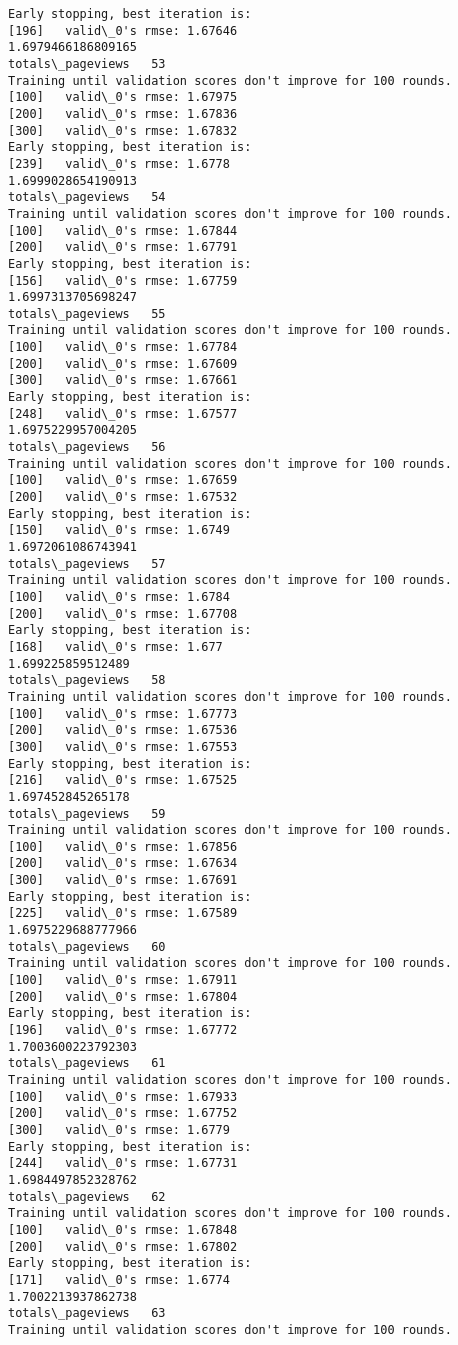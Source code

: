 \documentclass[11pt]{article}
\begin{document}
\begin{Verbatim}[commandchars=\\\{\}]
Early stopping, best iteration is:
[196]	valid\_0's rmse: 1.67646
1.6979466186809165
totals\_pageviews   53
Training until validation scores don't improve for 100 rounds.
[100]	valid\_0's rmse: 1.67975
[200]	valid\_0's rmse: 1.67836
[300]	valid\_0's rmse: 1.67832
Early stopping, best iteration is:
[239]	valid\_0's rmse: 1.6778
1.6999028654190913
totals\_pageviews   54
Training until validation scores don't improve for 100 rounds.
[100]	valid\_0's rmse: 1.67844
[200]	valid\_0's rmse: 1.67791
Early stopping, best iteration is:
[156]	valid\_0's rmse: 1.67759
1.6997313705698247
totals\_pageviews   55
Training until validation scores don't improve for 100 rounds.
[100]	valid\_0's rmse: 1.67784
[200]	valid\_0's rmse: 1.67609
[300]	valid\_0's rmse: 1.67661
Early stopping, best iteration is:
[248]	valid\_0's rmse: 1.67577
1.6975229957004205
totals\_pageviews   56
Training until validation scores don't improve for 100 rounds.
[100]	valid\_0's rmse: 1.67659
[200]	valid\_0's rmse: 1.67532
Early stopping, best iteration is:
[150]	valid\_0's rmse: 1.6749
1.6972061086743941
totals\_pageviews   57
Training until validation scores don't improve for 100 rounds.
[100]	valid\_0's rmse: 1.6784
[200]	valid\_0's rmse: 1.67708
Early stopping, best iteration is:
[168]	valid\_0's rmse: 1.677
1.699225859512489
totals\_pageviews   58
Training until validation scores don't improve for 100 rounds.
[100]	valid\_0's rmse: 1.67773
[200]	valid\_0's rmse: 1.67536
[300]	valid\_0's rmse: 1.67553
Early stopping, best iteration is:
[216]	valid\_0's rmse: 1.67525
1.697452845265178
totals\_pageviews   59
Training until validation scores don't improve for 100 rounds.
[100]	valid\_0's rmse: 1.67856
[200]	valid\_0's rmse: 1.67634
[300]	valid\_0's rmse: 1.67691
Early stopping, best iteration is:
[225]	valid\_0's rmse: 1.67589
1.6975229688777966
totals\_pageviews   60
Training until validation scores don't improve for 100 rounds.
[100]	valid\_0's rmse: 1.67911
[200]	valid\_0's rmse: 1.67804
Early stopping, best iteration is:
[196]	valid\_0's rmse: 1.67772
1.7003600223792303
totals\_pageviews   61
Training until validation scores don't improve for 100 rounds.
[100]	valid\_0's rmse: 1.67933
[200]	valid\_0's rmse: 1.67752
[300]	valid\_0's rmse: 1.6779
Early stopping, best iteration is:
[244]	valid\_0's rmse: 1.67731
1.6984497852328762
totals\_pageviews   62
Training until validation scores don't improve for 100 rounds.
[100]	valid\_0's rmse: 1.67848
[200]	valid\_0's rmse: 1.67802
Early stopping, best iteration is:
[171]	valid\_0's rmse: 1.6774
1.7002213937862738
totals\_pageviews   63
Training until validation scores don't improve for 100 rounds.

\end{Verbatim}
\end{document}
